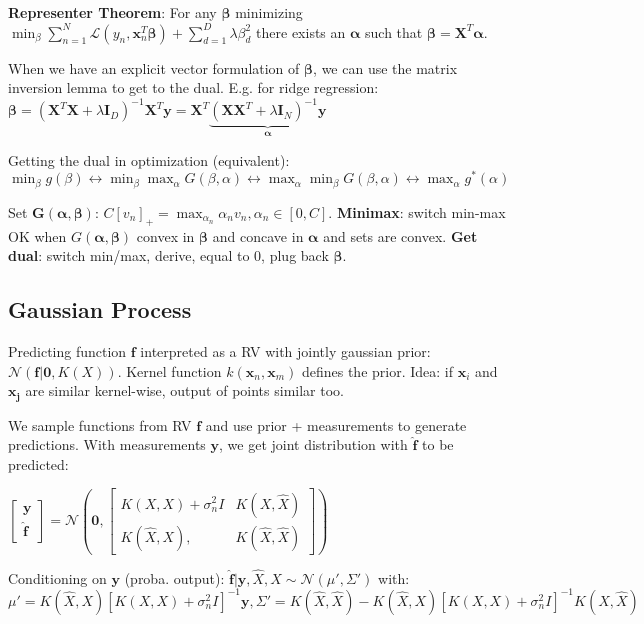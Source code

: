 \documentclass[10pt,a4paper,landscape]{extarticle}
\renewcommand{\bf}[1]{\ensuremath{\mathbf{#1}}}
\newcommand{\balpha}{\boldsymbol\alpha}
\newcommand{\bbeta}{\boldsymbol\beta}
\begin{document}
\begin{multicols*}{4}
\textbf{Representer Theorem}: For any $\bbeta$ minimizing
$\min_\beta \sum_{n=1}^N \mathcal{L}(y_n, \bf{x}_n^T \bbeta) + \sum_{d=1}^D \lambda \beta_d^2$
there exists an $\balpha$ such that $\bbeta = \bf{X}^T \balpha$.

When we have an explicit vector formulation of $\bbeta$, we can use the matrix inversion lemma to get to the dual. E.g. for ridge regression:
$\bbeta = (\bf{X}^T \bf{X}  + \lambda \bf{I}_D)^{-1} \bf{X}^T \bf{y}= \bf{X}^T \underbrace{(\bf{X X}^T + \lambda \bf{I}_N)^{-1} \bf{y}}_{\balpha}$

Getting the dual in optimization (equivalent):
$\min_{\beta} g(\beta) \leftrightarrow 
\min_{\beta} \max_{\alpha} G(\beta, \alpha) \leftrightarrow 
\max_{\alpha} \min_{\beta} G(\beta, \alpha) \leftrightarrow 
\max_{\alpha} g^*(\alpha)$

Set $\bf{G}(\balpha, \bbeta)$: $C[v_n]_+ = \max_{\alpha_n} \alpha_n v_n, \alpha_n \in [0, C]$.
\textbf{Minimax}: switch min-max OK when $G(\balpha, \bbeta)$ convex in $\bbeta$ and concave in $\balpha$ and sets are convex.
\textbf{Get dual}: switch min/max, derive, equal to 0, plug back $\bbeta$.

\subsection{Gaussian Process}
Predicting function $\bf{f}$ interpreted as a RV with jointly gaussian prior: $\mathcal{N}(\bf{f} | \bf{0}, K(X))$.
Kernel function $k(\bf{x}_n, \bf{x}_m)$ defines the prior. Idea: if $\bf{x}_i$ and $\bf{x_j}$ are similar kernel-wise, output of points similar too.

We sample functions from RV $\bf{f}$ and use prior + measurements to generate predictions. With measurements $\bf{y}$, we get joint distribution with $\bf{\hat{f}}$ to be predicted:

$
\begin{bmatrix}
  \bf{y} \\
  \bf{\hat{f}}
\end{bmatrix}
=
\mathcal{N} \left(
  \bf{0},
  \begin{bmatrix}
    K(X, X) + \sigma_n^2 I  & K(X, \hat{X}) \\
    K(\hat{X}, X),          & K(\hat{X}, \hat{X})
  \end{bmatrix}
\right)
$


Conditioning on $\bf{y}$ (proba. output): $\bf{\hat{f}} | \bf{y}, \hat{X}, X \sim \mathcal{N}(\mu ' , \Sigma ')$ with:
$\mu' = K(\hat{X}, X) [K(X,X) + \sigma_n^2 I]^{-1} \bf{y}, \Sigma' = K(\hat{X}, \hat{X}) - K(\hat{X}, X)[K(X,X) + \sigma_n^2 I ]^{-1} K(X, \hat{X})$



\end{multicols*}
\end{document}
